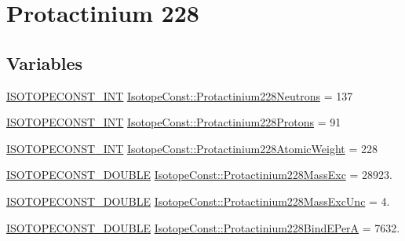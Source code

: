 \hypertarget{group___isotope_const-_protactinium-_pa228}{}\section{Protactinium 228}
\label{group___isotope_const-_protactinium-_pa228}
\subsection*{Variables}
\begin{DoxyCompactItemize}
\item 
\mbox{\hyperlink{group___isotope_const-_macros_ga5f18360b3e99483a35c32d789e62621c}{I\+S\+O\+T\+O\+P\+E\+C\+O\+N\+S\+T\+\_\+\+I\+NT}} \mbox{\hyperlink{group___isotope_const-_protactinium-_pa228_ga8bd676c2872f4837bc9b7b2576758740}{Isotope\+Const\+::\+Protactinium228\+Neutrons}} = 137
\item 
\mbox{\hyperlink{group___isotope_const-_macros_ga5f18360b3e99483a35c32d789e62621c}{I\+S\+O\+T\+O\+P\+E\+C\+O\+N\+S\+T\+\_\+\+I\+NT}} \mbox{\hyperlink{group___isotope_const-_protactinium-_pa228_ga5b46591311c48aa4e5bb27e2378ff69e}{Isotope\+Const\+::\+Protactinium228\+Protons}} = 91
\item 
\mbox{\hyperlink{group___isotope_const-_macros_ga5f18360b3e99483a35c32d789e62621c}{I\+S\+O\+T\+O\+P\+E\+C\+O\+N\+S\+T\+\_\+\+I\+NT}} \mbox{\hyperlink{group___isotope_const-_protactinium-_pa228_ga3ca1342684e6c1701346459c0498c0e4}{Isotope\+Const\+::\+Protactinium228\+Atomic\+Weight}} = 228
\item 
\mbox{\hyperlink{group___isotope_const-_macros_ga8f45a7272ce02c0b4c65c44636ed719a}{I\+S\+O\+T\+O\+P\+E\+C\+O\+N\+S\+T\+\_\+\+D\+O\+U\+B\+LE}} \mbox{\hyperlink{group___isotope_const-_protactinium-_pa228_ga935af6002371c0b6fdba46285296ef97}{Isotope\+Const\+::\+Protactinium228\+Mass\+Exc}} = 28923.
\item 
\mbox{\hyperlink{group___isotope_const-_macros_ga8f45a7272ce02c0b4c65c44636ed719a}{I\+S\+O\+T\+O\+P\+E\+C\+O\+N\+S\+T\+\_\+\+D\+O\+U\+B\+LE}} \mbox{\hyperlink{group___isotope_const-_protactinium-_pa228_ga2f193f413be1175ea9ab4490ba769042}{Isotope\+Const\+::\+Protactinium228\+Mass\+Exc\+Unc}} = 4.
\item 
\mbox{\hyperlink{group___isotope_const-_macros_ga8f45a7272ce02c0b4c65c44636ed719a}{I\+S\+O\+T\+O\+P\+E\+C\+O\+N\+S\+T\+\_\+\+D\+O\+U\+B\+LE}} \mbox{\hyperlink{group___isotope_const-_protactinium-_pa228_gaabc197f472b6a711ebd49aa2a464dcfd}{Isotope\+Const\+::\+Protactinium228\+Bind\+E\+PerA}} = 7632.

\end{DoxyCompactItemize}
